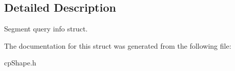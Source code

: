 \subsection{Detailed Description}
Segment query info struct. 

The documentation for this struct was generated from the following file\+:\begin{DoxyCompactItemize}
\item 
cp\+Shape.\+h\end{DoxyCompactItemize}
